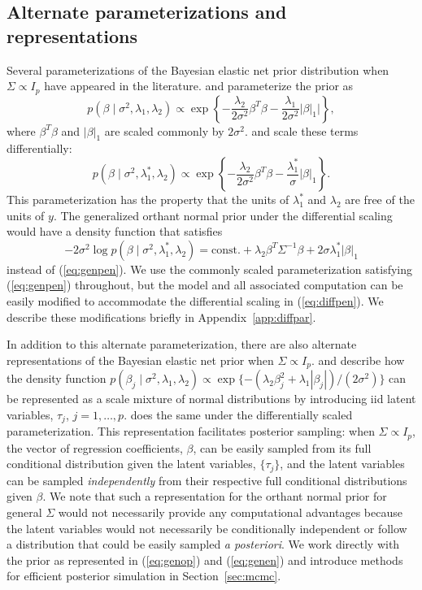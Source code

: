 \documentclass[12pt]{article}
\begin{document}
\subsection{Alternate parameterizations and representations}\label{sec:altparrep}
Several parameterizations of the Bayesian elastic net prior distribution when $\Sigma \propto I_p$ 
have appeared in the literature. \citet{li:10} and \citet{hans:11} parameterize the prior as
\[
	p(\beta \mid \sigma^2, \lambda_1, \lambda_2) \propto \exp\left\{-\frac{\lambda_2}{2\sigma^2}
		\beta^T\beta - \frac{\lambda_1}{2\sigma^2}|\beta|_1|\right\},
\]
where $\beta^T\beta$ and $|\beta|_1$ are scaled commonly by $2\sigma^2$. \citet{kyun:10}
and \citet{roy:17} scale these terms differentially:
\[
	p(\beta \mid \sigma^2, \lambda_1^*, \lambda_2) \propto
		\exp\left\{-\frac{\lambda_2}{2\sigma^2}\beta^T\beta -
		\frac{\lambda_1^*}{\sigma}|\beta|_1\right\}.
\]
This parameterization has the property that the units of $\lambda_1^*$ and $\lambda_2$
are free of the units of $y$. The generalized orthant normal prior under the differential 
scaling would have a density function that satisfies
\begin{equation}
	-2\sigma^2 \log p(\beta \mid \sigma^2, \lambda_1^*, \lambda_2) = \mbox{const.} +
		\lambda_2 \beta^T \Sigma^{-1}\beta	+ 2\sigma \lambda_1^* |\beta|_1
		\label{eq:diffpen}
\end{equation}
instead of (\ref{eq:genpen}). We use the commonly scaled parameterization satisfying
(\ref{eq:genpen}) throughout, but the model and all associated computation can be easily
modified to accommodate the differential scaling in (\ref{eq:diffpen}). We describe these
modifications briefly in Appendix~\ref{app:diffpar}.

In addition to this alternate parameterization, there are also alternate representations of the
Bayesian elastic net prior when $\Sigma \propto I_p$. \citet{li:10} and \citet{hans:11}
describe how the density function $p(\beta_j \mid \sigma^2, \lambda_1, \lambda_2)
\propto \exp\{-(\lambda_2 \beta_j^2 + \lambda_1 |\beta_j|)/(2\sigma^2)\}$ can be
represented as a scale mixture of normal distributions \citep{andr:74, west:87} by
introducing iid latent variables, $\tau_j$, $j=1, \ldots, p$. \citet{roy:17} does the same under 
the differentially scaled parameterization. This representation facilitates posterior sampling:
when $\Sigma \propto I_p$, the vector of regression coefficients, $\beta$, can be easily sampled 
from its full conditional distribution given the latent variables, $\{\tau_j\}$, and the latent 
variables can be sampled \emph{independently} from their respective full conditional distributions 
given $\beta$.  We note that such a representation for the orthant normal prior for general $\Sigma$
would not necessarily provide any computational advantages because the latent 
variables would not necessarily be conditionally independent or follow a distribution that
could be easily sampled \emph{a posteriori}. We work directly with the prior as represented
in (\ref{eq:genop}) and (\ref{eq:genen}) and introduce methods for efficient posterior
simulation in Section~\ref{sec:mcmc}.
\end{document}
